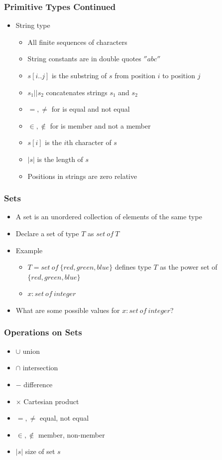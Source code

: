 \documentclass[t,12pt,numbers,fleqn]{beamer}
\begin{document}
\begin{frame}
\frametitle{Primitive Types Continued}
\begin{itemize}
\item String type
\begin{itemize}
\item All finite sequences of characters
\item String constants are in double quotes $''abc''$
\item $s[i..j]$ is the substring of $s$ from position $i$ to position $j$
\item $s_1 || s_2$ concatenates strings $s_1$ and $s_2$
\item $=, \neq$ for is equal and not equal
\item $\in, \notin$ for is member and not a member
\item $s[i]$ is the $i$th character of $s$
\item $|s|$ is the length of $s$
\item Positions in strings are zero relative
\end{itemize}
\end{itemize}
\end{frame}


\begin{frame}
\frametitle{Sets}
\begin{itemize}
\item A set is an unordered collection of elements of the same type
\item Declare a set of type $T$ as $set~of~T$
\item Example
\begin{itemize}
\item $T = set~of~ \{red, green, blue \}$ defines type $T$ as the power set of $\{red, green, blue \}$
\item $x: set~of~integer$
\end{itemize}
\item What are some possible values for $x: set~of~integer$?
\end{itemize}
\end{frame}


\begin{frame}
\frametitle{Operations on Sets}
\begin{itemize}
\item $\cup$ union
\item $\cap$ intersection
\item $-$ difference
\item $\times$ Cartesian product
\item $=, \neq$ equal, not equal
\item $\in, \notin$ member, non-member
\item $|s|$ size of set $s$
\end{itemize}
\end{frame}
\end{document}
